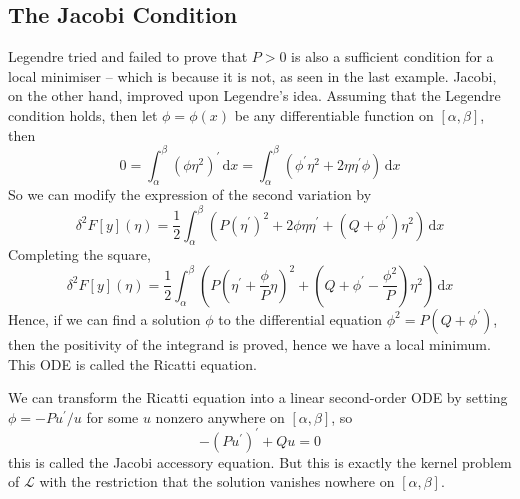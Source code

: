\documentclass[a4paper]{article}
\begin{document}
\subsection{The Jacobi Condition}
Legendre tried and failed to prove that $P>0$ is also a sufficient condition for a local minimiser -- which is because it is not, as seen in the last example.
Jacobi, on the other hand, improved upon Legendre's idea.
Assuming that the Legendre condition holds, then let $\phi=\phi(x)$ be any differentiable function on $[\alpha,\beta]$, then
$$0=\int_\alpha^\beta (\phi\eta^2)^\prime\,\mathrm dx=\int_\alpha^\beta(\phi^\prime\eta^2+2\eta\eta^\prime\phi)\,\mathrm dx$$
So we can modify the expression of the second variation by
$$\delta^2F[y](\eta)=\frac{1}{2}\int_\alpha^\beta(P(\eta^\prime)^2+2\phi\eta\eta^\prime+(Q+\phi^\prime)\eta^2)\,\mathrm dx$$
Completing the square,
$$\delta^2F[y](\eta)=\frac{1}{2}\int_\alpha^\beta \left( P\left( \eta^\prime+\frac{\phi}{P}\eta \right)^2 +\left( Q+\phi^\prime-\frac{\phi^2}{P} \right)\eta^2\right)\,\mathrm dx$$
Hence, if we can find a solution $\phi$ to the differential equation $\phi^2=P(Q+\phi^\prime)$, then the positivity of the integrand is proved, hence we have a local minimum.
This ODE is called the Ricatti equation.

We can transform the Ricatti equation into a linear second-order ODE by setting $\phi=-Pu^\prime/u$ for some $u$ nonzero anywhere on $[\alpha,\beta]$, so
$$-(Pu^\prime)^\prime+Qu=0$$
this is called the Jacobi accessory equation.
But this is exactly the kernel problem of $\mathcal L$ with the restriction that the solution vanishes nowhere on $[\alpha,\beta]$.
\end{document}
